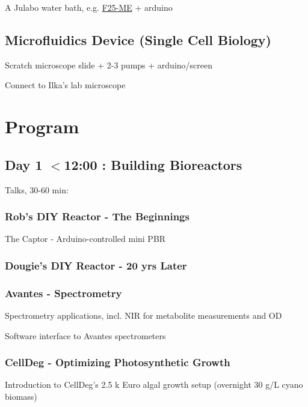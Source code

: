 \documentclass[12pt,a4paper]{scrartcl}
\begin{document}
A Julabo water bath,
e.g. \href{http://www.laborhandel24.de/9162625-de?utm_source=google_shopping&gclid=Cj0KEQiA496zBRDoi5OY3p2xmaUBEiQArLNnK6uWkryhjvkNdmRLgcg2W_HIO9W1aKaKCO9gmvlkt_MaAmhe8P8HAQ}{F25-ME}
+ arduino

\subsection{Microfluidics Device (Single Cell Biology)} 
\label{micro}

Scratch microscope slide + 2-3 pumps + arduino/screen

Connect to Ilka's lab microscope


\newpage

\section{Program}

\subsection{Day 1 $<$12:00 : Building Bioreactors}

Talks, 30-60 min:

\subsubsection{Rob's DIY Reactor - The Beginnings}

The Captor - Arduino-controlled mini PBR

\subsubsection{Dougie's DIY Reactor - 20 yrs Later}
\subsubsection{Avantes - Spectrometry}

Spectrometry applications, incl. NIR for metabolite measurements and OD

Software interface to Avantes spectrometers

\subsubsection{CellDeg - Optimizing Photosynthetic Growth}

Introduction to CellDeg's 2.5 k Euro algal growth setup (overnight 30 g/L
cyano biomass)
\end{document}
